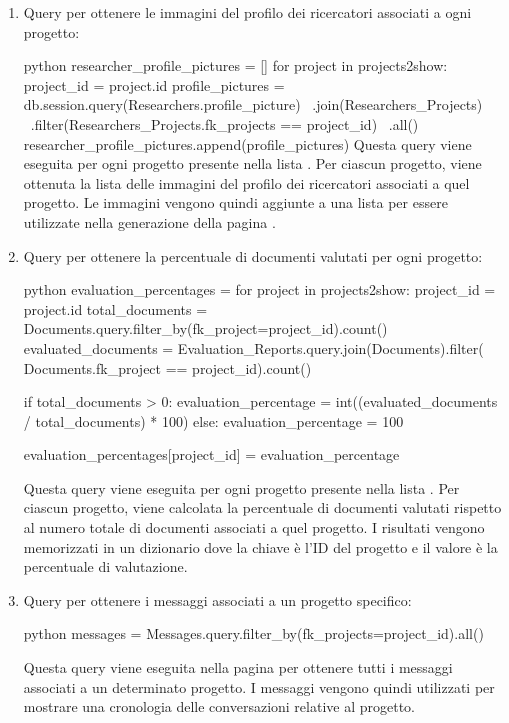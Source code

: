 \documentclass{report}
\begin{document}
\begin{enumerate}
\item   Query per ottenere le immagini del profilo dei ricercatori associati a ogni progetto:\\
\begin{minipage}{\linewidth}
\begin{imtaCode}{python}
researcher_profile_pictures = []
for project in projects2show:
    project_id = project.id
    profile_pictures = db.session.query(Researchers.profile_picture) \
        .join(Researchers_Projects) \
        .filter(Researchers_Projects.fk_projects == project_id) \
        .all()
    researcher_profile_pictures.append(profile_pictures)
Questa query viene eseguita per ogni progetto presente nella lista . Per ciascun progetto, viene ottenuta la lista delle immagini del profilo dei ricercatori associati a quel progetto. Le immagini vengono quindi aggiunte a una lista per essere utilizzate nella generazione della pagina .
     \end{imtaCode}
\end{minipage}
\item Query per ottenere la percentuale di documenti valutati per ogni progetto:\\
\begin{minipage}{\linewidth}
\begin{imtaCode}{python}
evaluation_percentages = {}
for project in projects2show:
    project_id = project.id
    total_documents = Documents.query.filter_by(fk_project=project_id).count()
    evaluated_documents = Evaluation_Reports.query.join(Documents).filter(
        Documents.fk_project == project_id).count()

    if total_documents > 0:
        evaluation_percentage = int((evaluated_documents / total_documents) * 100)
    else:
        evaluation_percentage = 100

    evaluation_percentages[project_id] = evaluation_percentage
         \end{imtaCode}
\end{minipage}
Questa query viene eseguita per ogni progetto presente nella lista . Per ciascun progetto, viene calcolata la percentuale di documenti valutati rispetto al numero totale di documenti associati a quel progetto. I risultati vengono memorizzati in un dizionario dove la chiave è l'ID del progetto e il valore è la percentuale di valutazione.

\item Query per ottenere i messaggi associati a un progetto specifico:\\
\begin{minipage}{\linewidth}
\begin{imtaCode}{python}
messages = Messages.query.filter_by(fk_projects=project_id).all()
         \end{imtaCode}
\end{minipage}
Questa query viene eseguita nella pagina  per ottenere tutti i messaggi associati a un determinato progetto. I messaggi vengono quindi utilizzati per mostrare una cronologia delle conversazioni relative al progetto.


\end{enumerate}
\end{document}
